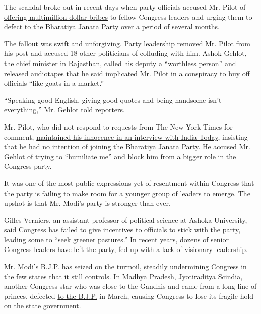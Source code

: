 The scandal broke out in recent days when party officials accused Mr.
Pilot of
\href{https://theprint.in/politics/sachin-pilot-offered-me-rs-35-crore-to-join-bjp-says-congress-mla/464610/}{offering
multimillion-dollar bribes} to fellow Congress leaders and urging them
to defect to the Bharatiya Janata Party over a period of several months.

The fallout was swift and unforgiving. Party leadership removed Mr.
Pilot from his post and accused 18 other politicians of colluding with
him. Ashok Gehlot, the chief minister in Rajasthan, called his deputy a
``worthless person'' and released audiotapes that he said implicated Mr.
Pilot in a conspiracy to buy off officials ``like goats in a market.''

``Speaking good English, giving good quotes and being handsome isn't
everything,'' Mr. Gehlot
\href{https://www.ndtv.com/india-news/rajasthan-crisis-ashok-gehlot-on-sachin-pilot-handsome-with-good-english-not-enough-2263222}{told
reporters}.

Mr. Pilot, who did not respond to requests from The New York Times for
comment,
\href{https://www.indiatoday.in/india/story/exclusive-sachin-pilot-interview-congress-rajasthan-political-crisis-ashok-gehlot-1700675-2020-07-15}{maintained
his innocence in an interview with India Today}, insisting that he had
no intention of joining the Bharatiya Janata Party. He accused Mr.
Gehlot of trying to ``humiliate me'' and block him from a bigger role in
the Congress party.

It was one of the most public expressions yet of resentment within
Congress that the party is failing to make room for a younger group of
leaders to emerge. The upshot is that Mr. Modi's party is stronger than
ever.

Gilles Verniers, an assistant professor of political science at Ashoka
University, said Congress has failed to give incentives to officials to
stick with the party, leading some to ``seek greener pastures.'' In
recent years, dozens of senior Congress leaders have
\href{https://www.theweek.in/news/india/2020/03/12/aaya-ram-gaya-ram-a-contemporary-history-of-defections-to-the-bjp.html}{left
the party}, fed up with a lack of visionary leadership.

Mr. Modi's B.J.P. has seized on the turmoil, steadily undermining
Congress in the few states that it still controls. In Madhya Pradesh,
Jyotiraditya Scindia, another Congress star who was close to the Gandhis
and came from a long line of princes, defected
\href{https://www.indiatoday.in/india/story/madhya-pradesh-govt-crisis-floor-test-kamal-nath-congress-bjp-1657768-2020-03-20}{to
the B.J.P.} in March, causing Congress to lose its fragile hold on the
state government.

